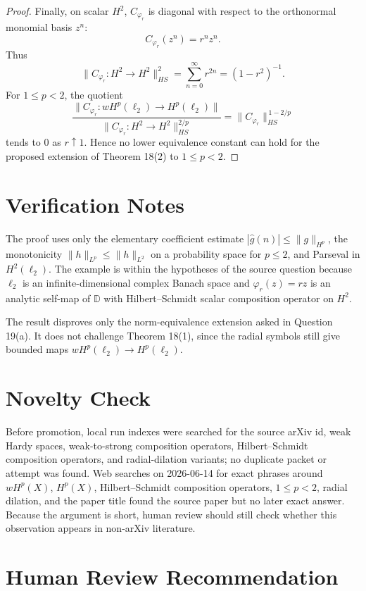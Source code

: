 \documentclass[11pt]{article}
\newcommand{\D}{\mathbb D}
\newcommand{\whp}{wH^p}
\newcommand{\hp}{H^p}
\begin{document}
\begin{proof}
Finally, on scalar \(H^2\), \(C_{\varphi_r}\) is diagonal with respect to the
orthonormal monomial basis \(z^n\):
\[
 C_{\varphi_r}(z^n)=r^n z^n.
\]
Thus
\[
 \|C_{\varphi_r}:H^2\to H^2\|_{HS}^2
 =
 \sum_{n=0}^{\infty} r^{2n}
 =
 (1-r^2)^{-1}.
\]
For \(1\leq p<2\), the quotient
\[
 \frac{\|C_{\varphi_r}:wH^p(\ell_2)\to H^p(\ell_2)\|}
      {\|C_{\varphi_r}:H^2\to H^2\|_{HS}^{2/p}}
 =
 \|C_{\varphi_r}\|_{HS}^{\,1-2/p}
\]
tends to \(0\) as \(r\uparrow1\).  Hence no lower equivalence constant can hold
for the proposed extension of Theorem 18(2) to \(1\leq p<2\).
\end{proof}

\section*{Verification Notes}

The proof uses only the elementary coefficient estimate
\(|\widehat g(n)|\leq\|g\|_{H^p}\), the monotonicity
\(\|h\|_{L^p}\leq\|h\|_{L^2}\) on a probability space for \(p\leq2\), and
Parseval in \(H^2(\ell_2)\).  The example is within the hypotheses of the
source question because \(\ell_2\) is an infinite-dimensional complex Banach
space and \(\varphi_r(z)=rz\) is an analytic self-map of \(\D\) with
Hilbert--Schmidt scalar composition operator on \(H^2\).

The result disproves only the norm-equivalence extension asked in Question
19(a).  It does not challenge Theorem 18(1), since the radial symbols still
give bounded maps \(wH^p(\ell_2)\to H^p(\ell_2)\).

\section*{Novelty Check}

Before promotion, local run indexes were searched for the source arXiv id,
weak Hardy spaces, weak-to-strong composition operators, Hilbert--Schmidt
composition operators, and radial-dilation variants; no duplicate packet or
attempt was found.  Web searches on 2026-06-14 for exact phrases around
\(\whp(X)\), \(\hp(X)\), Hilbert--Schmidt composition operators,
\(1\leq p<2\), radial dilation, and the paper title found the source paper but
no later exact answer.  Because the argument is short, human review should
still check whether this observation appears in non-arXiv literature.

\section*{Human Review Recommendation}
\end{document}
